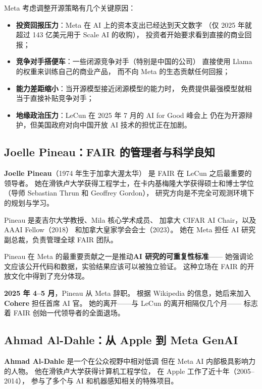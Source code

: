 \begin{corebox}[开源策略为什么可能变化？]
Meta 考虑调整开源策略有几个关键原因：
\begin{itemize}
  \item \textbf{投资回报压力}：Meta 在 AI 上的资本支出已经达到天文数字
    （仅 2025 年就超过 143 亿美元用于 Scale AI 的收购），
    投资者开始要求看到直接的商业回报；
  \item \textbf{竞争对手搭便车}：一些闭源竞争对手（特别是中国的公司）
    直接使用 Llama 的权重来训练自己的商业产品，
    而不向 Meta 的生态贡献任何回报；
  \item \textbf{能力差距缩小}：当开源模型接近闭源模型的能力时，
    免费提供最强模型就相当于直接补贴竞争对手；
  \item \textbf{地缘政治压力}：LeCun 在 2025 年 7 月的 AI for Good 峰会上
    仍在为开源辩护，但美国政府对向中国开放 AI 技术的担忧正在加剧。
\end{itemize}
\end{corebox}

\subsection{Joelle Pineau：FAIR 的管理者与科学良知}

\textbf{Joelle Pineau}（1974 年生于加拿大渥太华）
是 FAIR 在 LeCun 之后最重要的领导者。
她在滑铁卢大学获得工程学士，在卡内基梅隆大学获得硕士和博士学位
（导师 Sebastian Thrun 和 Geoffrey Gordon），
研究方向是不完全可观测环境下的规划与学习。

Pineau 是麦吉尔大学教授、Mila 核心学术成员、
加拿大 CIFAR AI Chair，以及 AAAI Fellow（2018）
和加拿大皇家学会会士（2023）。
她在 Meta 担任 AI 研究副总裁，负责管理全球 FAIR 团队。

Pineau 在 Meta 的最重要贡献之一是推动\textbf{AI 研究的可重复性标准}——
她强调论文应该公开代码和数据，实验结果应该可以被独立验证。
这种立场在 FAIR 的开放文化中得到了充分体现。

\textbf{2025 年 4--5 月}，Pineau 从 Meta 辞职。
根据 Wikipedia 的信息，她后来加入 \textbf{Cohere} 担任首席 AI 官。
她的离开——与 LeCun 的离开相隔仅几个月——
标志着 FAIR 创始一代领导者的全面退场。

\subsection{Ahmad Al-Dahle：从 Apple 到 Meta GenAI}

\textbf{Ahmad Al-Dahle} 是一个在公众视野中相对低调
但在 Meta AI 内部极具影响力的人物。
他在滑铁卢大学获得计算机工程学位，
在 Apple 工作了近十年（2005--2014），
参与了多个与 AI 和机器感知相关的特殊项目。

